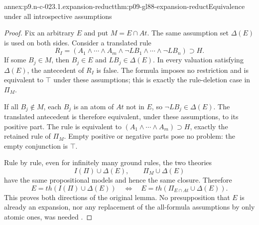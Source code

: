 \begin{annexitem}{annex:p9.n-c-023.1.expansion-reduct}{thm:p09-gl88-expansion-reduct}{Equivalence under all introspective assumptions}
\begin{proof}
Fix an arbitrary \(E\) and put \(M=E\cap At\).  The same assumption
set \(\Delta(E)\) is used on both sides.  Consider a translated rule
\[
 R_I=(A_1\land\cdots\land A_m\land
       \neg LB_1\land\cdots\land\neg LB_n)\supset H.
\]
If some \(B_j\in M\), then \(B_j\in E\) and \(LB_j\in\Delta(E)\).
In every valuation satisfying \(\Delta(E)\), the antecedent of \(R_I\)
is false.  The formula imposes no restriction and is equivalent to
\(\top\) under these assumptions; this is exactly the rule-deletion
case in \(\Pi_M\).

If all \(B_j\notin M\), each \(B_j\) is an atom of \(At\) not in
\(E\), so \(\neg LB_j\in\Delta(E)\).  The translated antecedent is
therefore equivalent, under these assumptions, to its positive part.
The rule is equivalent to
\((A_1\land\cdots\land A_m)\supset H\), exactly the retained
rule of \(\Pi_M\).  Empty positive or negative parts pose no problem:
the empty conjunction is \(\top\).

Rule by rule, even for infinitely many ground rules, the two theories
\[
 I(\Pi)\cup\Delta(E),\qquad \Pi_M\cup\Delta(E)
\]
have the same propositional models and hence the same closure.  Therefore
\[
 E=th(I(\Pi)\cup\Delta(E))
 \quad\Longleftrightarrow\quad
 E=th(\Pi_{E\cap At}\cup\Delta(E)).
\]
This proves both directions of the original lemma.  No presupposition that
\(E\) is already an expansion, nor any replacement of the all-formula
assumptions by only atomic ones, was needed
\cite[\S4, lemma and proof, p.~9]{GelfondLifschitz1988}.
\end{proof}
\end{annexitem}

